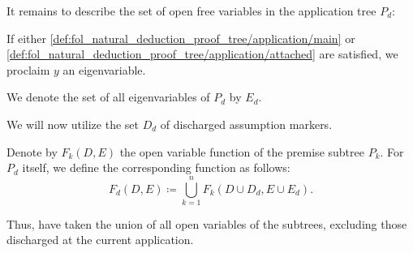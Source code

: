 \begin{definition}
\begin{thmenum}[resume=def:fol_natural_deduction_proof_tree]
    It remains to describe the set of open free variables in the application tree \( P_d \):
    \begin{thmenum}[resume=def:fol_natural_deduction_proof_tree/application]
       If either \cref{def:fol_natural_deduction_proof_tree/application/main} or \cref{def:fol_natural_deduction_proof_tree/application/attached} are satisfied, we proclaim \( y \) an eigenvariable.

      We denote the set of all eigenvariables of \( P_d \) by \( E_d \).

       We will now utilize the set \( D_d \) of discharged assumption markers.

      Denote by \( F_k(D, E) \) the open variable function of the premise subtree \( P_k \). For \( P_d \) itself, we define the corresponding function as follows:
      \begin{equation*}
        F_d(D, E) \coloneqq \bigcup_{k=1}^n F_k(D \cup D_d, E \cup E_d).
      \end{equation*}

      Thus, have taken the union of all open variables of the subtrees, excluding those discharged at the current application.
    \end{thmenum}
  \end{thmenum}
\end{definition}
